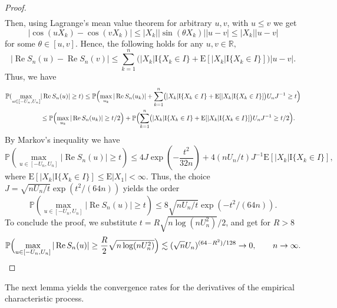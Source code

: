 \documentclass[numbers,webpdf,imaiai]{ima-authoring-template}%
\theoremstyle{thmstyletwo}%
\newcommand{\R}{\mathbb{R}}
\newcommand{\E}{\mathrm{E}}
\newcommand{\I}{{\mathrm{I}}}
\renewcommand{\P}{\mathbb{P}}
\renewcommand{\Re}{\operatorname{Re}}
\numberwithin{equation}{section}
\begin{document}
\begin{proof}
\begin{align*}
    \end{align*}
    Then, using  Lagrange's mean value theorem for arbitrary $u, v$, with $u \leq v$ we get
    \begin{equation*}
        |\cos(uX_k) - \cos(vX_k)| \leq |X_k||\sin(\theta X_k)||u - v| \leq |X_k||u - v|
    \end{equation*}
    for some $\theta \in [u, v]$.
    Hence, the following holds for any \(u, v \in \R,\)
    \begin{equation*}
        |\Re S_n(u) - \Re S_n(v) | \leq \sum_{k=1}^n \bigl(|X_k|\I\{X_k \in I\} + \E [|X_k|\I\{X_k \in I\}]\bigr)|u - v|.
    \end{equation*}
    Thus, we have
    \begin{align*}
         \P(\max_{u \in [-U_n, U_n]}  &|\Re S_n(u)| \geq t) \leq \P\Bigl(\max_{u_k} |\Re S_n(u_k)| +\sum_{k=1}^n \bigl(|X_k|\I\{X_k \in I\} + \E [|X_k|\I\{X_k \in I\}]\bigr) U_nJ^{-1}  \geq t\Bigr)\\
         &\leq \P\Bigl(\max_{u_k} |\Re S_n(u_k)| \geq t/2\Bigr) + \P\Bigl(\sum_{k=1}^n \bigl(|X_k|\I\{X_k \in I\} + \E [|X_k|\I\{X_k \in I\}]\bigr) U_nJ^{-1}  \geq t/2\Bigr).
    \end{align*}
By Markov's inequality we have
    \begin{equation*}
        \P(\max_{u \in [-U_n, U_n]}  |\Re S_n(u)| \geq t) \leq 4J\exp(-\frac{t^2}{32n}) + 4(nU_n/t)J^{-1}\E[|X_k|\I\{X_k \in I\}],
    \end{equation*}
    where \(\E[|X_k|\I\{X_k \in I\}] \leq \E|X_1| < \infty.\) Thus, the choice $J = \sqrt{nU_n/t}\exp{(t^2/(64n))}$ yields the order
    \begin{equation*}
        \P(\max_{u \in [-U_n, U_n]}  |\Re S_n(u)| \geq t) \leq 8 \sqrt{nU_n/t}\exp(-t^2/(64n)).
    \end{equation*}
To conclude the proof, we substitute \(t=R\sqrt{n\log(nU_n^2)}/2\), and get  
for $R > 8$ 
    \begin{equation*}
        \P\Bigl(\max_{u \in [-U_n, U_n]}  |\Re S_n(u)| \geq \frac{R}{2}\sqrt{n\log(nU_n^2)}\Bigr) \lesssim (\sqrt{n}U_n)^{(64-R^2)/128} \to 0, \qquad n \to \infty.
    \end{equation*}
\end{proof}

The next lemma yields the convergence rates for the derivatives of the empirical characteristic process.
\end{document}
